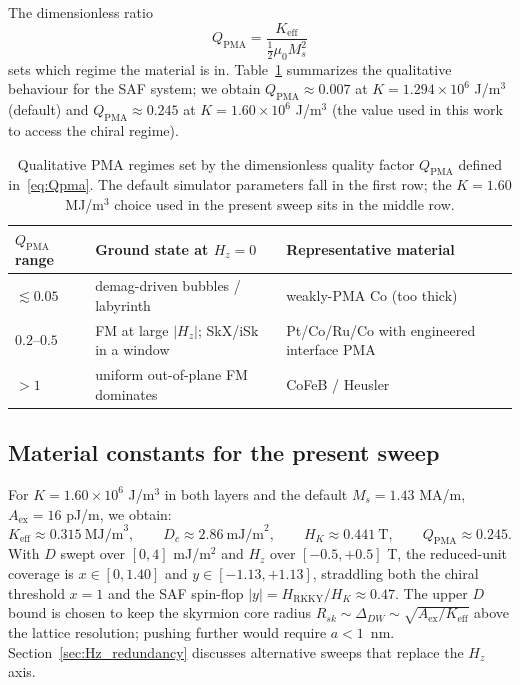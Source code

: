 \documentclass[11pt,a4paper]{article}
\newcommand{\Keff}{K_{\text{eff}}}
\newcommand{\Aex}{A_{\text{ex}}}
\newcommand{\Ms}{M_s}
\newcommand{\HK}{H_K}
\newcommand{\Dc}{D_c}
\newcommand{\Qpma}{Q_{\text{PMA}}}
\newcommand{\HRKKY}{H_{\text{RKKY}}}
\begin{document}
The dimensionless ratio
%
\begin{equation}\label{eq:Qpma}
\Qpma = \frac{\Keff}{\tfrac{1}{2}\mu_0 \Ms^2}
\end{equation}
%
sets which regime the material is in.
Table~\ref{tab:Qpma_regimes} summarizes the qualitative
behaviour for the SAF system; we obtain
$\Qpma \approx 0.007$ at $K = 1.294 \times 10^6$ J/m$^3$
(default) and $\Qpma \approx 0.245$ at
$K = 1.60 \times 10^6$ J/m$^3$ (the value used in this
work to access the chiral regime).
%
\begin{table}[h]
\centering
\small
\begin{tabular}{l p{5.0cm} p{5.0cm}}
\toprule
$\Qpma$ range & Ground state at $H_z = 0$ &
    Representative material \\
\midrule
$\lesssim 0.05$ & demag-driven bubbles / labyrinth
    & weakly-PMA Co (too thick) \\
$0.2$--$0.5$ & FM at large $|H_z|$;
    SkX/iSk in a window
    & Pt/Co/Ru/Co with engineered interface PMA \\
$> 1$ & uniform out-of-plane FM dominates
    & CoFeB / Heusler \\
\bottomrule
\end{tabular}
\caption{Qualitative PMA regimes set by the dimensionless
quality factor $\Qpma$ defined in~\eqref{eq:Qpma}. The
default simulator parameters fall in the first row; the
$K = 1.60$ MJ/m$^3$ choice used in the present sweep sits in
the middle row.}
\label{tab:Qpma_regimes}
\end{table}

\subsection{Material constants for the present sweep}

For $K = 1.60 \times 10^6$ J/m$^3$ in both layers and the
default $\Ms = 1.43$ MA/m, $\Aex = 16$ pJ/m, we obtain:
%
\begin{equation*}
\Keff \approx 0.315\ \text{MJ/m}^3,
\qquad
\Dc \approx 2.86\ \text{mJ/m}^2,
\qquad
\HK \approx 0.441\ \text{T},
\qquad
\Qpma \approx 0.245.
\end{equation*}
%
With $D$ swept over $[0, 4]$ mJ/m$^2$ and $H_z$ over
$[-0.5, +0.5]$ T, the reduced-unit coverage is
$x \in [0, 1.40]$ and $y \in [-1.13, +1.13]$, straddling
both the chiral threshold $x = 1$ and the SAF spin-flop
$|y| = \HRKKY / \HK \approx 0.47$. The upper $D$ bound is
chosen to keep the skyrmion core radius
$R_{sk} \sim \Delta_{DW} \sim \sqrt{\Aex / \Keff}$ above
the lattice resolution; pushing further would require
$a < 1$~nm. Section~\ref{sec:Hz_redundancy} discusses
alternative sweeps that replace the $H_z$ axis.
\end{document}
